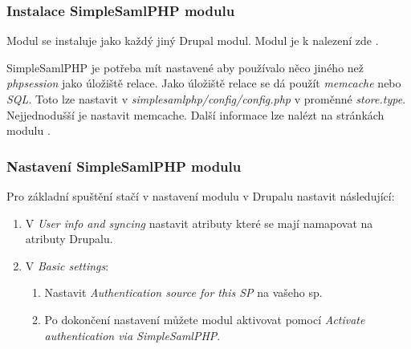 \subsubsection{Instalace SimpleSamlPHP modulu} %

Modul se instaluje jako každý jiný Drupal modul. Modul je k nalezení zde \cite{SimpleSAMLphpDrupal}.

SimpleSamlPHP je potřeba mít nastavené aby používalo něco jiného než \emph{phpsession} jako úložiště relace. Jako úložiště relace se dá použít \emph{memcache} nebo \emph{SQL}.
Toto lze nastavit v \emph{simplesamlphp/config/config.php} v proměnné \emph{store.type}.
Nejjednodušší je nastavit memcache. Další informace lze nalézt na stránkách modulu \cite{SimpleSAMLphpDrupal}.

\subsubsection{Nastavení SimpleSamlPHP modulu} %

Pro základní spuštění stačí v nastavení modulu v Drupalu nastavit následující:

\begin{enumerate}
    \item V \emph{User info and syncing} nastavit atributy které se mají namapovat na atributy Drupalu.
    \item V \emph{Basic settings}:
    \begin{enumerate}
        \item Nastavit \emph{Authentication source for this SP} na vašeho sp.
        \item Po dokončení nastavení můžete modul aktivovat pomocí \emph{Activate authentication via SimpleSamlPHP}.
    \end{enumerate}

\end{enumerate}



    
    
